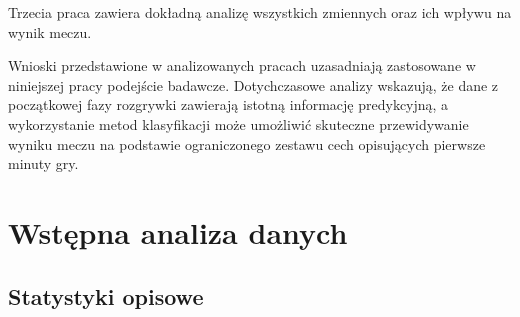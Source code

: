 \documentclass[twoside]{customStyle}
\begin{document}
Trzecia praca \cite{arancio_decisions_10min} zawiera dokładną analizę wszystkich zmiennych oraz ich wpływu na
wynik meczu.

Wnioski przedstawione w analizowanych pracach uzasadniają zastosowane w niniejszej pracy podejście badawcze. Dotychczasowe analizy wskazują, że dane z początkowej fazy rozgrywki zawierają istotną informację predykcyjną, a wykorzystanie metod klasyfikacji może umożliwić skuteczne przewidywanie wyniku meczu na podstawie ograniczonego zestawu cech opisujących pierwsze minuty gry.
\section{Wstępna analiza danych}
\subsection{Statystyki opisowe}
\end{document}
